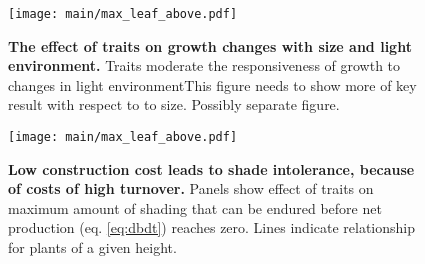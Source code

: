 \documentclass[a4paper,11pt]{article}
\begin{document}
\newpage

\begin{figure}[ht]
\centering
\texttt{[image: main/max\_leaf\_above.pdf]}
\caption{\textbf{The effect of traits on growth changes with size and
light environment.} Traits moderate the responsiveness of growth to changes in light
environmentThis figure needs to show more of key result with respect to to size.
Possibly separate figure. \label{f-shifts}}
\end{figure}

\newpage

\begin{figure}[ht]
\centering
\texttt{[image: main/max\_leaf\_above.pdf]}
\caption{\textbf{Low construction cost leads to shade intolerance,
because of costs of high turnover.} Panels show effect of traits on
maximum amount of shading that can be endured before net production (eq.
\ref{eq:dbdt}) reaches zero. Lines indicate relationship for plants of a
given height. \label{f-wplcp}}
\end{figure}

\clearpage
\end{document}
